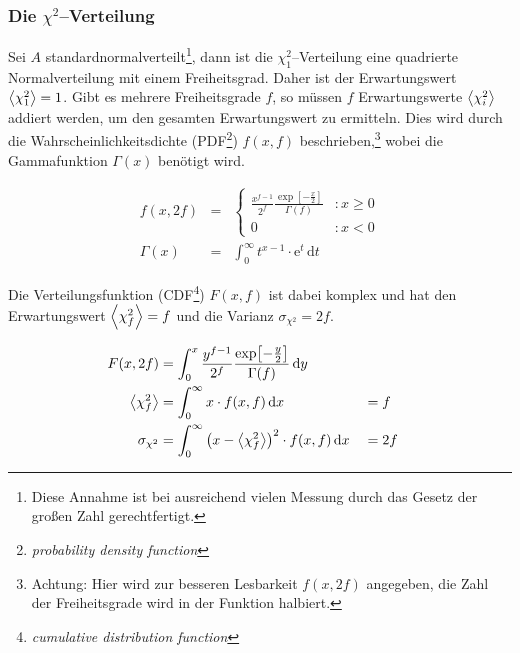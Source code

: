 \documentclass[12pt,a4paper]{scrartcl}
\numberwithin{equation}{section} %
\renewcommand{\[}{} %
\renewcommand{\]}{\noindent} %
\begin{document}
\hypertarget{die-chi2verteilung}{%
\subsubsection{\texorpdfstring{Die
\(\chi^2\)--Verteilung}{Die \textbackslash chi\^{}2--Verteilung}}\label{die-chi2verteilung}}

Sei \(A\) standardnormalverteilt\footnote{Diese Annahme ist bei
  ausreichend vielen Messung durch das Gesetz der großen Zahl
  gerechtfertigt.}, dann ist die \(\chi_1^2\)--Verteilung eine
quadrierte Normalverteilung mit einem Freiheitsgrad. Daher ist der
Erwartungswert \(\expval{\chi_1^2}=1\). Gibt es mehrere Freiheitsgrade
\(f\), so müssen \(f\) Erwartungswerte \(\expval{\chi_i^2}\) addiert
werden, um den gesamten Erwartungswert zu ermitteln. Dies wird durch die
Wahrscheinlichkeitsdichte (PDF\footnote{\emph{probability density
  function}}) \(f(x, f)\) beschrieben,\footnote{Achtung: Hier wird zur
  besseren Lesbarkeit \(f(x, 2f)\) angegeben, die Zahl der
  Freiheitsgrade wird in der Funktion halbiert.} wobei die Gammafunktion
\(\Gamma(x)\) benötigt wird.

\[
\begin{eqnarray}
    f(x, 2f) &=&
        \begin{cases}
                \frac{x^{f-1}}{2^f}
                    \frac{\exp[-\frac{x}{2}]}{\Gamma(f)}
                    & : x\ge 0 \\
                0 & : x < 0
        \end{cases} \\
    \Gamma(x) &=& \int_0^\infty t^{x-1}\cdot \mathrm e^t \,\mathrm dt
\end{eqnarray}
\]

Die Verteilungsfunktion (CDF\footnote{\emph{cumulative distribution
  function}}) \(F(x, f)\) ist dabei komplex und hat den Erwartungswert
\(\expval{\chi_f^2}=f\) und die Varianz \(\sigma_{\chi^2}=2f\).

\[
\begin{align}
    F(x, 2f) &=
        \int_0^x
            \frac{y^{f-1}}{2^f}
                \frac{\exp[-\frac{y}{2}]}{\Gamma(f)}
            \,\mathrm dy \\
    \expval{\chi_f^2} &=
        \int_0^\infty x\cdot f(x, f)
            \,\mathrm dx
        &&= f \\
    \sigma_{\chi^2} &=
        \int_0^\infty \left(x - \expval{\chi_f^2}\right)^2 \cdot f(x, f)
            \,\mathrm dx
         &&=2f
\end{align}
\]
\end{document}
